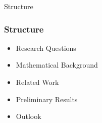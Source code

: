 \begin{frame}{Structure}
    \frametitle{Structure}
    \begin{itemize}
        \item Research Questions
        \item Mathematical Background
        \item Related Work
        \item Preliminary Results
        \item Outlook
    \end{itemize}
\end{frame}
